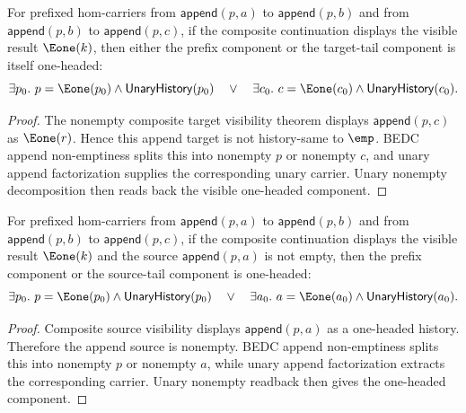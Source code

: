 \begin{theorem}
\label{thm:functor-prefix-hom-carrier-comp-nonempty-result-target-component-e1-cases}
For prefixed hom-carriers from $\mathsf{append}(p,a)$ to
$\mathsf{append}(p,b)$ and from $\mathsf{append}(p,b)$ to
$\mathsf{append}(p,c)$, if the composite continuation displays the visible
result $\Eone(k)$, then either the prefix component or the target-tail
component is itself one-headed:
$$
\exists p_0.\ p=\Eone(p_0)\land\mathsf{UnaryHistory}(p_0)
\quad\vee\quad
\exists c_0.\ c=\Eone(c_0)\land\mathsf{UnaryHistory}(c_0).
$$
\end{theorem}
\begin{proof}
The nonempty composite target visibility theorem displays
$\mathsf{append}(p,c)$ as $\Eone(r)$. Hence this append target is not
history-same to $\emp$. BEDC append non-emptiness splits this into nonempty
$p$ or nonempty $c$, and unary append factorization supplies the corresponding
unary carrier. Unary nonempty decomposition then reads back the visible
one-headed component.
\end{proof}

\begin{theorem}
\label{thm:functor-prefix-hom-carrier-comp-nonempty-result-source-component-e1-cases}
For prefixed hom-carriers from $\mathsf{append}(p,a)$ to
$\mathsf{append}(p,b)$ and from $\mathsf{append}(p,b)$ to
$\mathsf{append}(p,c)$, if the composite continuation displays the visible
result $\Eone(k)$ and the source $\mathsf{append}(p,a)$ is not empty, then the
prefix component or the source-tail component is one-headed:
$$
\exists p_0.\ p=\Eone(p_0)\land\mathsf{UnaryHistory}(p_0)
\quad\vee\quad
\exists a_0.\ a=\Eone(a_0)\land\mathsf{UnaryHistory}(a_0).
$$
\end{theorem}
\begin{proof}
Composite source visibility displays $\mathsf{append}(p,a)$ as a one-headed
history. Therefore the append source is nonempty. BEDC append non-emptiness
splits this into nonempty $p$ or nonempty $a$, while unary append
factorization extracts the corresponding carrier. Unary nonempty readback then
gives the one-headed component.
\end{proof}


